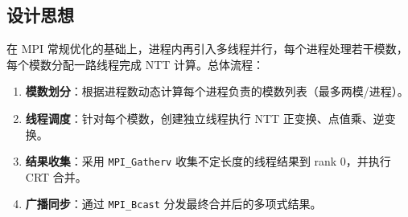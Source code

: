 \documentclass[a4paper]{article}
\begin{document}
\subsection{设计思想}
在 MPI 常规优化的基础上，进程内再引入多线程并行，每个进程处理若干模数，每个模数分配一路线程完成 NTT 计算。总体流程：
\begin{enumerate}
	\item \textbf{模数划分}：根据进程数动态计算每个进程负责的模数列表（最多两模/进程）。
	\item \textbf{线程调度}：针对每个模数，创建独立线程执行 NTT 正变换、点值乘、逆变换。
	\item \textbf{结果收集}：采用 \texttt{MPI\_Gatherv} 收集不定长度的线程结果到 rank 0，并执行 CRT 合并。
	\item \textbf{广播同步}：通过 \texttt{MPI\_Bcast} 分发最终合并后的多项式结果。
\end{enumerate}
\end{document}
